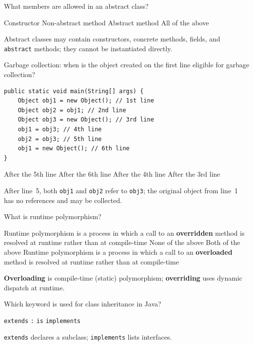 \newpage

\question[4]
What members are allowed in an abstract class?
\begin{choices}
  \choice Constructor
  \choice Non-abstract method
  \choice Abstract method
  \CorrectChoice All of the above
\end{choices}
\begin{solution}
  Abstract classes may contain constructors, concrete methods, fields, and \texttt{abstract} methods; they cannot be instantiated directly.
\end{solution}

\question[4]
Garbage collection: when is the object created on the first line eligible for garbage collection?
\begin{lstlisting}[style=java]
public static void main(String[] args) {
    Object obj1 = new Object(); // 1st line
    Object obj2 = obj1; // 2nd line
    Object obj3 = new Object(); // 3rd line
    obj1 = obj3; // 4th line
    obj2 = obj3; // 5th line
    obj1 = new Object(); // 6th line
}
\end{lstlisting}
\begin{choices}
  \CorrectChoice After the 5th line
  \choice After the 6th line
  \choice After the 4th line
  \choice After the 3rd line
\end{choices}
\begin{solution}
  After line~5, both \texttt{obj1} and \texttt{obj2} refer to \texttt{obj3}; the original object from line~1 has no references and may be collected.
\end{solution}

\question[4]
What is runtime polymorphism?
\begin{choices}
  \CorrectChoice Runtime polymorphism is a process in which a call to an \textbf{overridden} method is resolved at runtime rather than at compile-time
  \choice None of the above
  \choice Both of the above
  \choice Runtime polymorphism is a process in which a call to an \textbf{overloaded} method is resolved at runtime rather than at compile-time
\end{choices}
\begin{solution}
  \textbf{Overloading} is compile-time (static) polymorphism; \textbf{overriding} uses dynamic dispatch at runtime.
\end{solution}

\question[4]
Which keyword is used for class inheritance in Java?
\begin{choices}
  \CorrectChoice \texttt{extends}
  \choice \texttt{:}
  \choice \texttt{is}
  \choice \texttt{implements}
\end{choices}
\begin{solution}
  \texttt{extends} declares a subclass; \texttt{implements} lists interfaces.
\end{solution}

